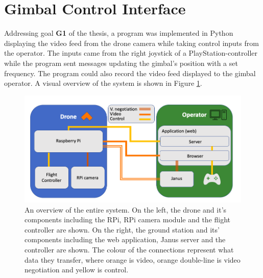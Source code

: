 \documentclass[nofilelist]{cslthse-msc}
\begin{document}
\section{Gimbal Control Interface}
Addressing goal \textbf{G1} of the thesis, a program was implemented in Python displaying the video feed from the drone camera while taking control inputs from the operator. The inputs came from the right joystick of a PlayStation-controller while the program sent messages updating the gimbal's position with a set frequency. The program could also record the video feed displayed to the gimbal operator. A visual overview of the system is shown in Figure \ref{fig:system-overview}.
\begin{figure}[!hbt]
   \centering
   \includegraphics[scale=0.5]{images/system-overview.png} 
   \caption{An overview of the entire system. On the left, the drone and it's components including the RPi, RPi camera module and the flight controller are shown. On the right, the ground station and its' components including the web application, Janus server and the controller are shown. The colour of the connections represent what data they transfer, where orange is video, orange double-line is video negotiation and yellow is control.}
   \label{fig:system-overview}
\end{figure}
\end{document}
